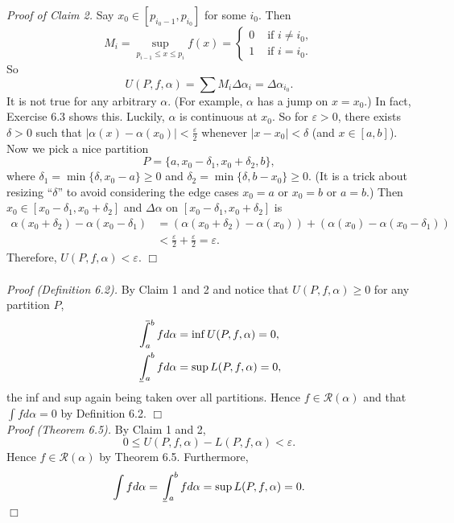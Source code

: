 \documentclass{article}
\def\upint{\mathchoice%
    {\mkern13mu\overline{\vphantom{\intop}\mkern7mu}\mkern-20mu}%
    {\mkern7mu\overline{\vphantom{\intop}\mkern7mu}\mkern-14mu}%
    {\mkern7mu\overline{\vphantom{\intop}\mkern7mu}\mkern-14mu}%
    {\mkern7mu\overline{\vphantom{\intop}\mkern7mu}\mkern-14mu}%
  \int}
\def\lowint{\mkern3mu\underline{\vphantom{\intop}\mkern7mu}\mkern-10mu\int}
\begin{document}
\emph{Proof of Claim 2.}
Say $x_0 \in [p_{i_0 - 1}, p_{i_0}]$ for some $i_0$.
Then
\begin{equation*}
  M_i = \sup_{p_{i - 1} \leq x \leq p_i} f(x) =
    \begin{cases}
      0 & \text{ if $i \neq i_0$}, \\
      1 & \text{ if $i = i_0$}.
    \end{cases}
\end{equation*}
So
$$U(P, f, \alpha) = \sum M_i \Delta \alpha_i = \Delta \alpha_{i_0}.$$
It is not true for any arbitrary $\alpha$. (For example, $\alpha$ has a jump on $x = x_0$.)
In fact, Exercise 6.3 shows this.
Luckily, $\alpha$ is continuous at $x_0$. So for $\varepsilon > 0$,
there exists $\delta > 0$ such that $|\alpha(x) - \alpha(x_0)| < \frac{\varepsilon}{2}$
whenever $|x - x_0| < \delta$ (and $x \in [a, b]$).
Now we pick a nice partition
$$P = \{ a, x_0 - \delta_1, x_0 + \delta_2, b \},$$
where $\delta_1 = \min\{\delta, x_0 - a\} \geq 0$
and $\delta_2 = \min\{\delta, b - x_0\} \geq 0$.
(It is a trick about resizing ``$\delta$''
to avoid considering the edge cases $x_0 = a$ or $x_0 = b$ or $a = b$.)
Then $x_0 \in [x_0 - \delta_1, x_0 + \delta_2]$
and $\Delta \alpha$ on $[x_0 - \delta_1, x_0 + \delta_2]$ is
\begin{align*}
\alpha(x_0 + \delta_2) - \alpha(x_0 - \delta_1)
&= (\alpha(x_0 + \delta_2) - \alpha(x_0)) + (\alpha(x_0) - \alpha(x_0 - \delta_1)) \\
&< \frac{\varepsilon}{2} + \frac{\varepsilon}{2} = \varepsilon.
\end{align*}
Therefore, $U(P, f, \alpha) < \varepsilon$.
$\Box$ \\\\



\emph{Proof (Definition 6.2).}
By Claim 1 and 2 and notice that $U(P, f, \alpha) \geq 0$ for any partition $P$,
\begin{align*}
\upint_a^b f d\alpha &= \inf U(P, f, \alpha) = 0, \\
\lowint_a^b f d\alpha &= \sup L(P, f, \alpha) = 0,
\end{align*}
the inf and sup again being taken over all partitions.
Hence $f \in \mathscr{R}(\alpha)$ and that $\int f d \alpha = 0$ by Definition 6.2.
$\Box$ \\

\emph{Proof (Theorem 6.5).}
By Claim 1 and 2,
$$0 \leq U(P, f, \alpha) - L(P, f, \alpha) < \varepsilon.$$
Hence $f \in \mathscr{R}(\alpha)$ by Theorem 6.5.
Furthermore,
$$\int f d \alpha = \lowint_a^b f d\alpha = \sup L(P, f, \alpha) = 0.$$
$\Box$ \\
\end{document}
